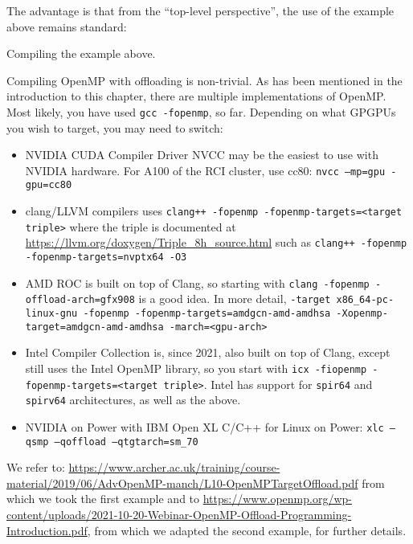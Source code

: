 The advantage is that from the ``top-level perspective'', the use of the example above remains standard: 

\raggedbottom
\begin{codebox}[]{}{}
\footnotesize Compiling the example above.
\tcblower
{}
\end{codebox}


Compiling OpenMP with offloading is non-trivial. As has been mentioned in the introduction to this chapter, there are multiple implementations of OpenMP. Most likely, you have used \verb|gcc -fopenmp|, so far. Depending on what GPGPUs you wish to target, you may need to switch:



\begin{itemize}
\item NVIDIA CUDA Compiler Driver NVCC may be the easiest to use with NVIDIA hardware. For A100 of the RCI cluster, use cc80: \verb|nvcc –mp=gpu -gpu=cc80|
\item clang/LLVM compilers uses \verb|clang++ -fopenmp -fopenmp-targets=<target triple>| where the triple is documented at \url{https://llvm.org/doxygen/Triple_8h_source.html} such as \verb|clang++ -fopenmp -fopenmp-targets=nvptx64 -O3|
\item AMD ROC is built on top of Clang, so starting with \verb|clang -fopenmp -offload-arch=gfx908| is a good idea. In more detail,  
\verb|-target x86_64-pc-linux-gnu -fopenmp -fopenmp-targets=amdgcn-amd-amdhsa -Xopenmp-target=amdgcn-amd-amdhsa -march=<gpu-arch>|
\item Intel Compiler Collection is, since 2021, also built on top of Clang, except still uses the Intel OpenMP library, so you start with \verb|icx -fiopenmp -fopenmp-targets=<target triple>|. Intel has support for \verb|spir64| and \verb|spirv64| architectures, as well as the above.
\item NVIDIA on Power with IBM Open XL C/C++ for Linux on Power: \verb|xlc –qsmp –qoffload –qtgtarch=sm_70|
\end{itemize} 

We refer to:
\url{https://www.archer.ac.uk/training/course-material/2019/06/AdvOpenMP-manch/L10-OpenMPTargetOffload.pdf}
from which we took the first example and to \url{https://www.openmp.org/wp-content/uploads/2021-10-20-Webinar-OpenMP-Offload-Programming-Introduction.pdf}, from which we adapted the second example, for further details. 

